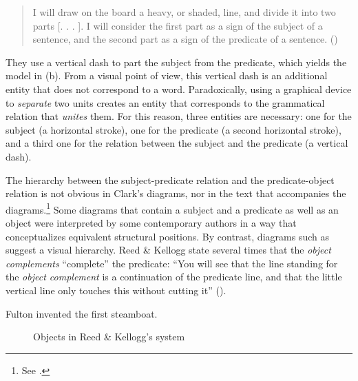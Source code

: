 \documentclass[english,output=paper,colorlinks,citecolor=brown]{../langscibook}
\begin{document}
\begin{quote}
I will draw on the board a heavy, or shaded, line, and divide it into two parts [. . . ]. I will consider the first part as a sign of the subject of a sentence, and the second part as a sign of the predicate of a sentence. (\citealt[17]{ReedBrainerd1879})
\end{quote}

They use a vertical dash to part the subject from the predicate, which yields the model in (b). From a visual point of view, this vertical dash is an additional entity that does not correspond to a word. Paradoxically, using a graphical device to \textit{separate} two units creates an entity that corresponds to the grammatical relation that \textit{unites} them. For this reason, three entities are necessary: one for the subject (a horizontal stroke), one for the predicate (a second horizontal stroke), and a third one for the relation between the subject and the predicate (a vertical dash).

\largerpage
The hierarchy between the subject-predicate relation and the predicate-object relation is not obvious in Clark’s diagrams, nor in the text that accompanies the diagrams.\footnote{\textrm{See \citet[§5.3.2]{ImrenyiMazziotta2020}.}} Some diagrams that contain a subject and a predicate as well as an object were interpreted by some contemporary authors \citep[30]{Jewell1867} in a way that conceptualizes equivalent structural positions. By contrast, diagrams such as  suggest a visual hierarchy. Reed \& Kellogg state several times that the \textit{object complements} “complete” the predicate: “You will see that the line standing for the \textit{object complement} is a continuation of the predicate line, and that the little vertical line only touches this without cutting it” (\citealt[54]{ReedBrainerd1879}).

\ea \label{ex:4:3} Fulton invented the first steamboat.\z

 \begin{figure}[t]
     \caption{Objects in Reed \& Kellogg's system\label{fig:4:6}}
 \end{figure}
\end{document}
